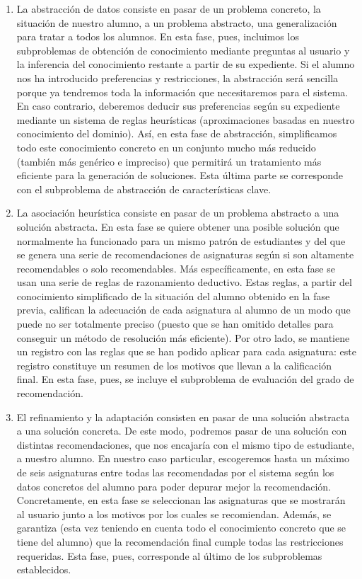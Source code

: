 \begin{enumerate}

\item La abstracción de datos consiste en pasar de un problema concreto, 
la situación de nuestro alumno, a un problema abstracto, una generalización 
para tratar a todos los alumnos. En esta fase, pues, incluimos los 
subproblemas de obtención de conocimiento mediante preguntas al usuario y la 
inferencia del conocimiento restante a partir de su expediente. 
Si el alumno nos ha introducido preferencias y restricciones, la abstracción 
será sencilla porque ya tendremos toda la información que necesitaremos para 
el sistema. En caso contrario, deberemos deducir sus preferencias según su 
expediente mediante un sistema de reglas heurísticas (aproximaciones basadas  
en nuestro conocimiento del dominio). Así, en esta fase de abstracción, 
simplificamos todo este conocimiento concreto en un conjunto mucho más 
reducido (también más genérico e impreciso) que permitirá un tratamiento 
más eficiente para la generación de soluciones. Esta última parte se 
corresponde con el subproblema de abstracción de características clave.

\item La asociación heurística consiste en pasar de un problema abstracto a 
una solución abstracta. En esta fase se quiere obtener una posible solución 
que normalmente ha funcionado para un mismo patrón de estudiantes y del que 
se genera una serie de recomendaciones de asignaturas según si son 
altamente recomendables o solo recomendables. Más específicamente, en esta 
fase se usan una serie de reglas de razonamiento deductivo. Estas reglas, a 
partir del conocimiento simplificado de la situación del alumno obtenido en 
la fase previa, califican la adecuación de cada asignatura al alumno de un 
modo que puede no ser totalmente preciso (puesto que se han omitido detalles 
para conseguir un método de resolución más eficiente). Por otro lado, se 
mantiene un registro con las reglas que se han podido aplicar para cada 
asignatura: este registro constituye un resumen de los motivos que llevan a 
la calificación final. En esta fase, pues, se incluye el subproblema de 
evaluación del grado de recomendación.

\item El refinamiento y la adaptación consisten en pasar de una solución 
abstracta a una solución concreta. De este modo, podremos pasar de una 
solución con distintas recomendaciones, que nos encajaría con el mismo 
tipo de estudiante, a nuestro alumno. En nuestro caso particular, escogeremos 
hasta un máximo de seis asignaturas entre todas las recomendadas por el 
sistema según los datos concretos del alumno para poder depurar mejor la 
recomendación. Concretamente, en esta fase se seleccionan las asignaturas que 
se mostrarán al usuario junto a los motivos por los cuales se recomiendan. 
Además, se garantiza (esta vez teniendo en cuenta todo el conocimiento 
concreto que se tiene del alumno) que la recomendación final cumple todas las 
restricciones requeridas. Esta fase, pues, corresponde al último de los 
subproblemas establecidos.

\end{enumerate}



